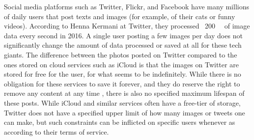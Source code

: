 Social media platforms such as Twitter, Flickr, and Facebook have many millions of daily users that post texts and images (for example, of their cats or funny videos). According to Henna Kermani at Twitter, they processed ~\SI{200}{\giga\byte} of image data every second in 2016\cite{MobileScaleLondona}. A single user posting a few images per day does not significantly change the amount of data processed or saved at all for these tech giants.%
The difference between the photos posted on Twitter compared to the ones stored on cloud services such as iCloud is that the images on Twitter are stored for free for the user, for what seems to be indefinitely. While there is no obligation for these services to save it forever, and they do reserve the right to remove any content at any time %
, there is also no specified maximum lifespan of these posts. While iCloud and similar services often have a free-tier of storage, Twitter does not have a specified upper limit of how many images or tweets one can make, but such constraints can be inflicted on specific users whenever as according to their terms of service.



% 











